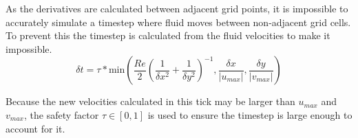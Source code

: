 As the derivatives are calculated between adjacent grid points, it is impossible to accurately simulate a timestep where fluid moves between non-adjacent grid cells.
To prevent this the timestep \deltaT{} is calculated from the fluid velocities to make it impossible.
\begin{equation}
    \delta{t} = \tau * \text{min}\left(
        \frac{Re}{2}\left(
            \frac{1}{\delta{x}^2} + \frac{1}{\delta{y}^2}
        \right)^{-1},
        \frac{\delta{x}}{|u_{max}|},
        \frac{\delta{y}}{|v_{max}|}
    \right)
\end{equation}

Because the new velocities calculated in this tick may be larger than $u_{max}$ and $v_{max}$, the safety factor $\tau \in [0, 1]$ is used to ensure the timestep is large enough to account for it\cite{TOME1994171}.

